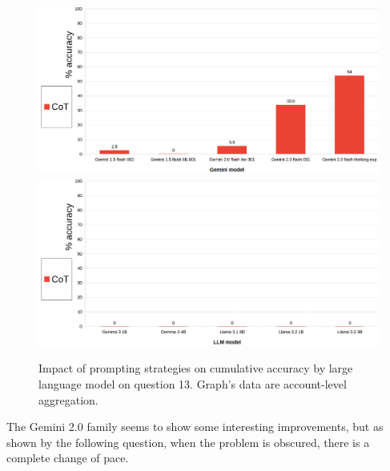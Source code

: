 \documentclass[12pt]{article}
\begin{document}
\begin{figure}[H]
    \centering
            \includegraphics[width=1\textwidth]{q301Gemini.png}
            \includegraphics[width=1\textwidth]{q301Other.png}
    \caption[Accuracy on Question 13 by LLM]{Impact of prompting strategies on cumulative accuracy by large language model on question 13. Graph's data are account-level aggregation.}
    \label{fig:38}
    \end{figure} 
The Gemini 2.0 family seems to show some interesting improvements, but as shown by the following question, when the problem is obscured, there is a complete change of pace.\\

\vspace{2cm}

\end{document}
